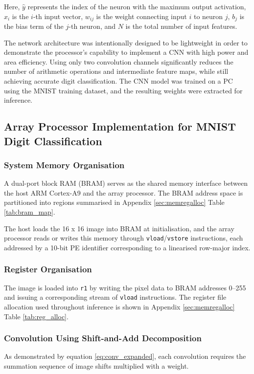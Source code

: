         Here, $\hat{y}$ represents the index of the neuron with the maximum output activation, $x_i$ is the $i$-th input vector, $w_{ij}$ is the weight connecting input $i$ to neuron $j$, $b_j$ is the bias term of the $j$-th neuron, and $N$ is the total number of input features.
    
        The network architecture was intentionally designed to be lightweight in order to demonstrate the processor's capability to implement a CNN with high power and area efficiency. Using only two convolution channels significantly reduces the number of arithmetic operations and intermediate feature maps, while still achieving accurate digit classification. The CNN model was trained on a PC using the MNIST training dataset, and the resulting weights were extracted for inference.
        
    \subsection{Array Processor Implementation for MNIST Digit Classification}
        
        \subsubsection{System Memory Organisation}
        A dual-port block RAM (BRAM) serves as the shared memory interface between the host ARM Cortex-A9 and the array processor. The BRAM address space is partitioned into regions summarised in Appendix \ref{sec:memregalloc} Table \ref{tab:bram_map}.
        
        The host loads the 16 x 16 image into BRAM at initialisation, and the array processor reads or writes this memory through \texttt{vload}/\texttt{vstore} instructions, each
        addressed by a 10-bit PE identifier corresponding to a linearised row-major index.

        \subsubsection{Register Organisation}
        
        The image is loaded into \texttt{r1} by writing the pixel data to BRAM addresses 0--255 and issuing a corresponding stream of \texttt{vload} instructions. The register file allocation used throughout inference is shown in Appendix \ref{sec:memregalloc} Table \ref{tab:reg_alloc}.
        

        \subsubsection{Convolution Using Shift-and-Add Decomposition}
        As demonstrated by equation \ref{eq:conv_expanded}, each convolution requires the summation sequence of image shifts multiplied with a weight.

